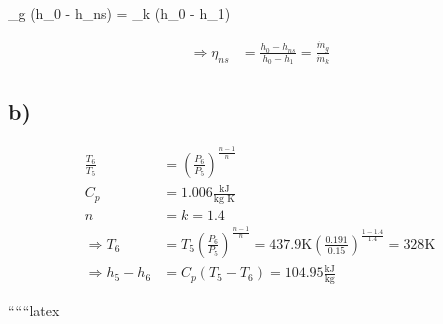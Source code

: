  \quad {}_g (h_0 - h_{ns}) = _k (h_0 - h_1)

\begin{align*}
\Rightarrow \eta_{ns} &= \frac{h_0 - h_{ns}}{h_0 - h_1} = \frac{\dot{m}_g}{\dot{m}_k}
\end{align*}

\subsection*{b)}

\begin{align*}
\frac{T_6}{T_5} &= \left( \frac{P_6}{P_5} \right)^{\frac{n-1}{n}} \\
C_p &= 1.006 \frac{\text{kJ}}{\text{kg K}} \\
n &= k = 1.4 \\
\Rightarrow T_6 &= T_5 \left( \frac{P_6}{P_5} \right)^{\frac{n-1}{n}} = 437.9 \text{K} \left( \frac{0.191}{0.15} \right)^{\frac{1-1.4}{1.4}} = 328 \text{K} \\
\Rightarrow h_5 - h_6 &= C_p (T_5 - T_6) = 104.95 \frac{\text{kJ}}{\text{kg}}
\end{align*}

``````latex


